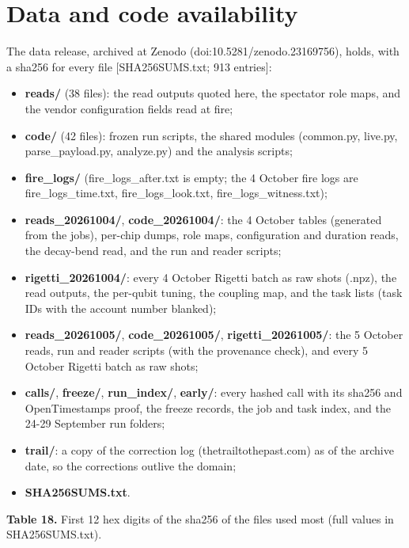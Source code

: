 \documentclass[11pt]{article}
\begin{document}
\section{Data and code availability}
The data release, archived at Zenodo (doi:10.5281/zenodo.23169756), holds, with a sha256 for every file {[}SHA256SUMS.txt; 913 entries{]}:

\begin{itemize}
\item \textbf{reads/} (38 files): the read outputs quoted here, the spectator role maps, and the vendor configuration fields read at fire;
\item \textbf{code/} (42 files): frozen run scripts, the shared modules (common.py, live.py, parse\_payload.py, analyze.py) and the analysis scripts;
\item \textbf{fire\_logs/} (fire\_logs\_after.txt is empty; the 4 October fire logs are fire\_logs\_time.txt, fire\_logs\_look.txt, fire\_logs\_witness.txt);
\item \textbf{reads\_20261004/}, \textbf{code\_20261004/}: the 4 October tables (generated from the jobs), per-chip dumps, role maps, configuration and duration reads, the decay-bend read, and the run and reader scripts;
\item \textbf{rigetti\_20261004/}: every 4 October Rigetti batch as raw shots (.npz), the read outputs, the per-qubit tuning, the coupling map, and the task lists (task IDs with the account number blanked);
\item \textbf{reads\_20261005/}, \textbf{code\_20261005/}, \textbf{rigetti\_20261005/}: the 5 October reads, run and reader scripts (with the provenance check), and every 5 October Rigetti batch as raw shots;
\item \textbf{calls/}, \textbf{freeze/}, \textbf{run\_index/}, \textbf{early/}: every hashed call with its sha256 and OpenTimestamps proof, the freeze records, the job and task index, and the 24-29 September run folders;
\item \textbf{trail/}: a copy of the correction log (thetrailtothepast.com) as of the archive date, so the corrections outlive the domain;
\item \textbf{SHA256SUMS.txt}.
\end{itemize}
\textbf{Table 18.} First 12 hex digits of the sha256 of the files used most (full values in SHA256SUMS.txt).
\end{document}
